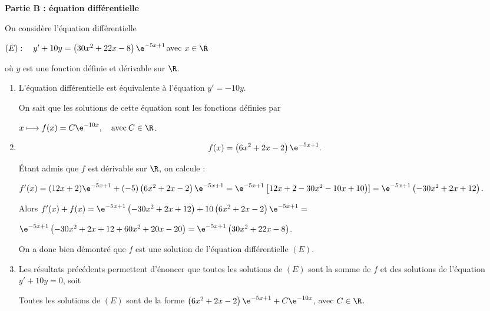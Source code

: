 \medskip

\textbf{Partie B : équation différentielle}

\medskip

On considère l'équation différentielle 

\begin{center}$(E) :\quad  y' + 10y = \left(30x^2 + 22x - 8\right)\e^{-5x+1}$\quad avec \quad $x \in \R$\end{center}

où $y$ est une fonction définie et dérivable sur $\R$.

\medskip

\begin{enumerate}
\item %
L'équation différentielle est équivalente à l'équation $y' = - 10y$.

On sait que les solutions de cette équation sont les fonctions définies par 

$x \longmapsto f(x) = C\e^{-10x}, \quad \text{avec}\: C \in \R$.
\item %

\[f(x) = \left(6x^2 + 2x - 2\right)\e^{-5x+ 1}.\]


Étant admis que $f$ est dérivable sur $\R$, on calcule :

$f'(x) = (12x + 2)\e^{-5x+ 1} + (- 5)\left(6x^2 + 2x - 2\right)\e^{-5x+ 1} = \e^{-5x+ 1}\left[12x + 2 - 30x^2- 10x + 10\right)] = \e^{-5x+ 1}\left(-30x^2 + 2x + 12\right)$.

Alors $f'(x) + f(x) = \e^{-5x+ 1}\left(-30x^2 + 2x + 12\right) + 10\left(6x^2 + 2x - 2\right)\e^{-5x+ 1} =$

$ \e^{-5x+ 1}\left(-30x^2 + 2x + 12 + 60x^2 + 20x - 20\right) = \e^{-5x+ 1}\left(30x^2 + 22x - 8\right)$.

On a donc bien démontré que $f$ est une solution de l'équation différentielle $(E)$.
\item %
Les résultats précédents permettent d'énoncer que toutes les solutions de $(E)$ sont la somme de $f$ et des solutions de l'équation $y' + 10y = 0$, soit 

Toutes les solutions de $(E)$ sont de la forme $\left(6x^2 + 2x - 2\right)\e^{-5x+ 1} + C\e^{-10x}$, avec $C \in \R$.
\end{enumerate}

